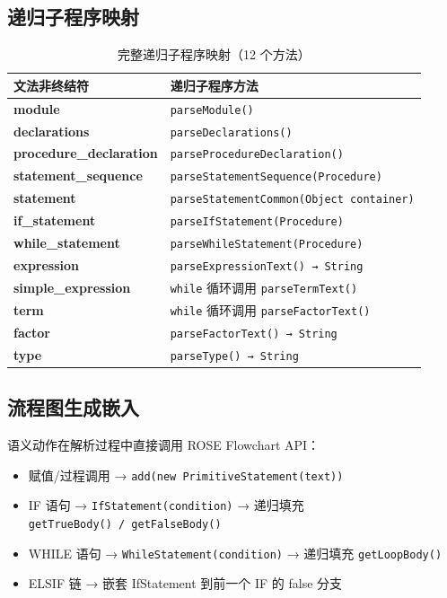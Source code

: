 \documentclass[12pt,a4paper,fontset=none]{ctexart}
\begin{document}
\subsection{递归子程序映射}

\begin{table}[H]\centering
\footnotesize
\setlength{\tabcolsep}{3pt}
\begin{tabularx}{\textwidth}{>{\bfseries}P{3.5cm}>{\raggedright\arraybackslash}X}
\toprule
文法非终结符 & 递归子程序方法 \\
\midrule
module & \texttt{parseModule()} \\
declarations & \texttt{parseDeclarations()} \\
procedure\_declaration & \texttt{parseProcedureDeclaration()} \\
statement\_sequence & \texttt{parseStatementSequence(Procedure)} \\
statement & \texttt{parseStatementCommon(Object\ container)} \\
if\_statement & \texttt{parseIfStatement(Procedure)} \\
while\_statement & \texttt{parseWhileStatement(Procedure)} \\
expression & \texttt{parseExpressionText()\ →\ String} \\
simple\_expression & \texttt{while} 循环调用 \texttt{parseTermText()} \\
term & \texttt{while} 循环调用 \texttt{parseFactorText()} \\
factor & \texttt{parseFactorText()\ →\ String} \\
type & \texttt{parseType()\ →\ String} \\
\bottomrule
\end{tabularx}
\caption{完整递归子程序映射（12 个方法）}
\end{table}

\subsection{流程图生成嵌入}

语义动作在解析过程中直接调用 ROSE Flowchart API：

{\raggedright
\begin{itemize}
  \item 赋值/过程调用 → \texttt{add(new\ PrimitiveStatement(text))}
  \item IF 语句 → \texttt{IfStatement(condition)} → 递归填充 \texttt{getTrueBody()\ /\ getFalseBody()}
  \item WHILE 语句 → \texttt{WhileStatement(condition)} → 递归填充 \texttt{getLoopBody()}
  \item ELSIF 链 → 嵌套 IfStatement 到前一个 IF 的 false 分支
\end{itemize}
}
\end{document}
